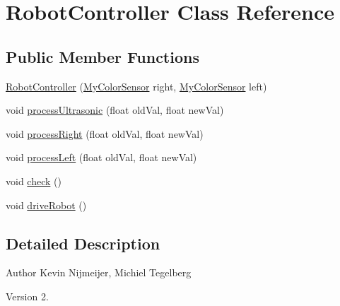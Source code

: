 \hypertarget{class_robot_controller}{\section{Robot\-Controller Class Reference}
\label{class_robot_controller}
}
\subsection*{Public Member Functions}
\begin{DoxyCompactItemize}
\item 
\hyperlink{class_robot_controller_a8497b295f6b89c734357c9c0e1c2d4be}{Robot\-Controller} (\hyperlink{class_my_color_sensor}{My\-Color\-Sensor} right, \hyperlink{class_my_color_sensor}{My\-Color\-Sensor} left)
\item 
void \hyperlink{class_robot_controller_a2cb1bc61fba8750cacf883a8096d23ea}{process\-Ultrasonic} (float old\-Val, float new\-Val)
\item 
void \hyperlink{class_robot_controller_a56d8544ef554fa42ae14df568d836cc9}{process\-Right} (float old\-Val, float new\-Val)
\item 
void \hyperlink{class_robot_controller_ac923fcdf536fec9f25fc241af598696b}{process\-Left} (float old\-Val, float new\-Val)
\item 
void \hyperlink{class_robot_controller_a904bf3feb989cd825e92e618184b9d66}{check} ()
\item 
void \hyperlink{class_robot_controller_a81581974756705e965436ce7b9aff352}{drive\-Robot} ()
\end{DoxyCompactItemize}


\subsection{Detailed Description}
\begin{DoxyAuthor}{Author}
Kevin Nijmeijer, Michiel Tegelberg 
\end{DoxyAuthor}
\begin{DoxyVersion}{Version}
2. 
\end{DoxyVersion}


